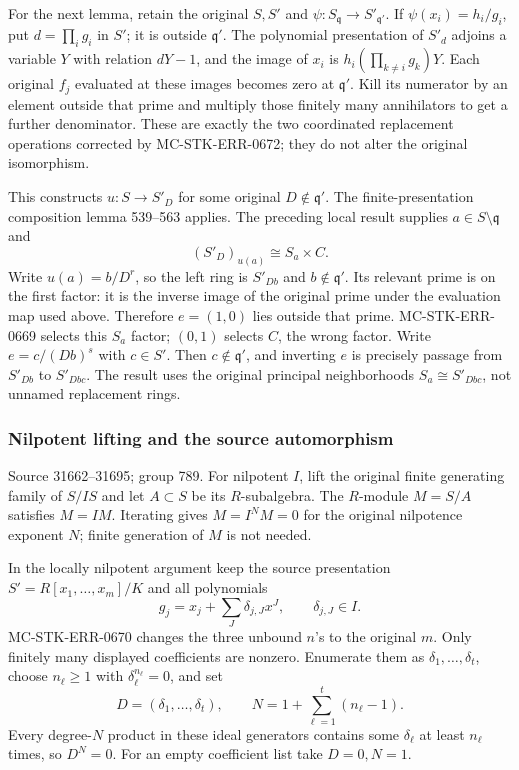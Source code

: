 For the next lemma, retain the original \(S,S'\) and \(\psi:S_{\mathfrak q}\to S'_{\mathfrak q'}\). If \(\psi(x_i)=h_i/g_i\), put \(d=\prod_i g_i\) in \(S'\); it is outside \(\mathfrak q'\). The polynomial presentation of \(S'_d\) adjoins a variable \(Y\) with relation \(dY-1\), and the image of \(x_i\) is \(h_i(\prod_{k\ne i}g_k)Y\). Each original \(f_j\) evaluated at these images becomes zero at \(\mathfrak q'\). Kill its numerator by an element outside that prime and multiply those finitely many annihilators to get a further denominator. These are exactly the two coordinated replacement operations corrected by MC-\AlgebraIdentifierBreak{}STK-\AlgebraIdentifierBreak{}ERR-\AlgebraIdentifierBreak{}0672; they do not alter the original isomorphism.

This constructs \(u:S\to S'_D\) for some original \(D\notin\mathfrak q'\). The finite-presentation composition lemma 539--563 applies. The preceding local result supplies \(a\in S\setminus\mathfrak q\) and \[
(S'_D)_{u(a)}\cong S_a\times C.
\] Write \(u(a)=b/D^r\), so the left ring is \(S'_{Db}\) and \(b\notin\mathfrak q'\). Its relevant prime is on the first factor: it is the inverse image of the original prime under the evaluation map used above. Therefore \(e=(1,0)\) lies outside that prime. MC-\AlgebraIdentifierBreak{}STK-\AlgebraIdentifierBreak{}ERR-\AlgebraIdentifierBreak{}0669 selects this \(S_a\) factor; \((0,1)\) selects \(C\), the wrong factor. Write \(e=c/(Db)^s\) with \(c\in S'\). Then \(c\notin\mathfrak q'\), and inverting \(e\) is precisely passage from \(S'_{Db}\) to \(S'_{Dbc}\). The result uses the original principal neighborhoods \(S_a\cong S'_{Dbc}\), not unnamed replacement rings.

\subsubsection{Nilpotent lifting and the source automorphism}\label{algebra-proof-035-nilpotent-lifting-and-the-source-automorphism}

Source 31662--31695; group 789. For nilpotent \(I\), lift the original finite generating family of \(S/IS\) and let \(A\subset S\) be its \(R\)-subalgebra. The \(R\)-module \(M=S/A\) satisfies \(M=IM\). Iterating gives \(M=I^NM=0\) for the original nilpotence exponent \(N\); finite generation of \(M\) is not needed.

In the locally nilpotent argument keep the source presentation \(S'=R[x_1,\ldots,x_m]/K\) and all polynomials \[
g_j=x_j+\sum_J\delta_{j,J}x^J,\qquad \delta_{j,J}\in I.
\] MC-\AlgebraIdentifierBreak{}STK-\AlgebraIdentifierBreak{}ERR-\AlgebraIdentifierBreak{}0670 changes the three unbound \(n\)'s to the original \(m\). Only finitely many displayed coefficients are nonzero. Enumerate them as \(\delta_1,\ldots,\delta_t\), choose \(n_\ell\ge1\) with \(\delta_\ell^{n_\ell}=0\), and set \[
D=(\delta_1,\ldots,\delta_t),\qquad N=1+\sum_{\ell=1}^t(n_\ell-1).
\] Every degree-\(N\) product in these ideal generators contains some \(\delta_\ell\) at least \(n_\ell\) times, so \(D^N=0\). For an empty coefficient list take \(D=0,N=1\).

